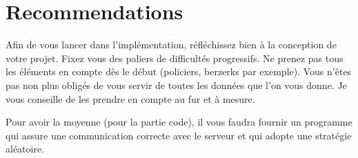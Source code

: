 \section{Recommendations} %

Afin de vous lancer dans l'implémentation, réfléchissez bien à la conception de votre projet.
Fixez vous des paliers de difficultés progressifs. Ne prenez pas tous les éléments en compte dès le début (policiers, berzerks par exemple).
Vous n'êtes pas non plus obligés de vous servir de toutes les données que l'on vous donne.
Je vous conseille de les prendre en compte au fur et à mesure.

Pour avoir la moyenne (pour la partie code), il vous faudra fournir un programme qui assure une communication correcte avec le serveur et qui adopte une stratégie aléatoire.

